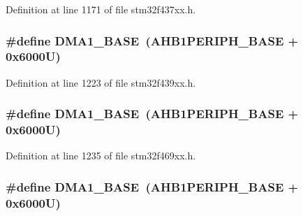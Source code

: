Definition at line 1171 of file stm32f437xx.\+h.

\subsubsection[{\texorpdfstring{D\+M\+A1\+\_\+\+B\+A\+SE}{DMA1_BASE}}]{\setlength{\rightskip}{0pt plus 5cm}\#define D\+M\+A1\+\_\+\+B\+A\+SE~({\bf A\+H\+B1\+P\+E\+R\+I\+P\+H\+\_\+\+B\+A\+SE} + 0x6000\+U)}\hypertarget{group___peripheral__memory__map_gab2d8a917a0e4ea99a22ac6ebf279bc72}{}\label{group___peripheral__memory__map_gab2d8a917a0e4ea99a22ac6ebf279bc72}


Definition at line 1223 of file stm32f439xx.\+h.

\subsubsection[{\texorpdfstring{D\+M\+A1\+\_\+\+B\+A\+SE}{DMA1_BASE}}]{\setlength{\rightskip}{0pt plus 5cm}\#define D\+M\+A1\+\_\+\+B\+A\+SE~({\bf A\+H\+B1\+P\+E\+R\+I\+P\+H\+\_\+\+B\+A\+SE} + 0x6000\+U)}\hypertarget{group___peripheral__memory__map_gab2d8a917a0e4ea99a22ac6ebf279bc72}{}\label{group___peripheral__memory__map_gab2d8a917a0e4ea99a22ac6ebf279bc72}


Definition at line 1235 of file stm32f469xx.\+h.

\subsubsection[{\texorpdfstring{D\+M\+A1\+\_\+\+B\+A\+SE}{DMA1_BASE}}]{\setlength{\rightskip}{0pt plus 5cm}\#define D\+M\+A1\+\_\+\+B\+A\+SE~({\bf A\+H\+B1\+P\+E\+R\+I\+P\+H\+\_\+\+B\+A\+SE} + 0x6000\+U)}\hypertarget{group___peripheral__memory__map_gab2d8a917a0e4ea99a22ac6ebf279bc72}{}\label{group___peripheral__memory__map_gab2d8a917a0e4ea99a22ac6ebf279bc72}


